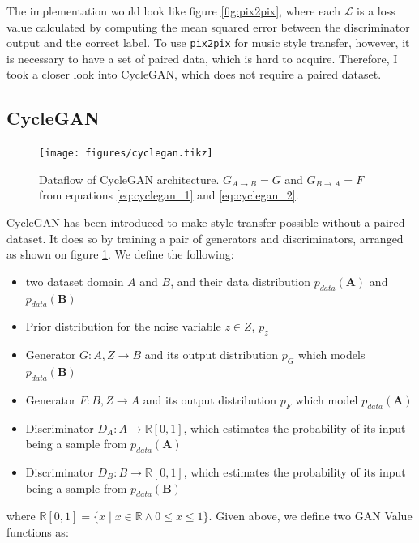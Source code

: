 \documentclass[12pt,a4paper,]{report}
\providecommand{\tightlist}{%
  \setlength{\itemsep}{0pt}\setlength{\parskip}{0pt}}
\begin{document}
The implementation would look like figure \ref{fig:pix2pix}, where each
\(\mathcal{L}\) is a loss value calculated by computing the mean squared
error between the discriminator output and the correct label. To use
\texttt{pix2pix} for music style transfer, however, it is necessary to
have a set of paired data, which is hard to acquire. Therefore, I took a
closer look into CycleGAN, which does not require a paired dataset.

\hypertarget{cyclegan}{%
\subsection{CycleGAN}\label{cyclegan}}

\begin{figure}[h]
    \texttt{[image: figures/cyclegan.tikz]}
\centering
\caption{Dataflow of CycleGAN architecture. $G_{A \rightarrow B} = G$ and $G_{B \rightarrow A} = F$ from equations \ref{eq:cyclegan_1} and \ref{eq:cyclegan_2}. \label{fig:cyclegan}}
\end{figure}

CycleGAN has been introduced to make style transfer possible without a
paired dataset. It does so by training a pair of generators and
discriminators, arranged as shown on figure \ref{fig:cyclegan}. We
define the following:

\begin{itemize}
\tightlist
\item
  two dataset domain \(A\) and \(B\), and their data distribution
  \(p_{data}(\mathbf{A})\) and \(p_{data}(\mathbf{B})\)
\item
  Prior distribution for the noise variable \(z \in Z\), \(p_z\)
\item
  Generator \(G: A, Z \rightarrow B\) and its output distribution
  \(p_G\) which models \(p_{data}(\mathbf{B})\)
\item
  Generator \(F: B, Z \rightarrow A\) and its output distribution
  \(p_F\) which model \(p_{data}(\mathbf{A})\)
\item
  Discriminator \(D_{A}: A \rightarrow \mathbb{R}[0, 1]\), which
  estimates the probability of its input being a sample from
  \(p_{data}(\mathbf{A})\)
\item
  Discriminator \(D_{B}: B \rightarrow \mathbb{R}[0, 1]\), which
  estimates the probability of its input being a sample from
  \(p_{data}(\mathbf{B})\)
\end{itemize}

where
\(\mathbb{R}[0, 1] = \{x \mid x \in \mathbb{R} \land 0 \leq x \leq 1 \}\).
Given above, we define two GAN Value functions as:
\end{document}
